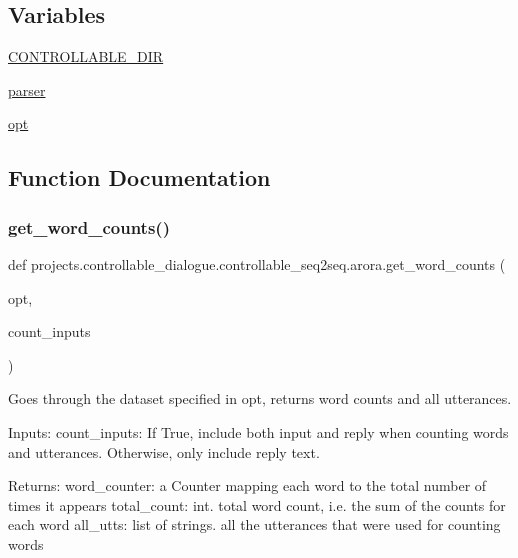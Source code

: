 \subsection*{Variables}
\begin{DoxyCompactItemize}
\item 
\hyperlink{namespaceprojects_1_1controllable__dialogue_1_1controllable__seq2seq_1_1arora_a13b07efaa3e2bffc511e07c6b5bd5522}{C\+O\+N\+T\+R\+O\+L\+L\+A\+B\+L\+E\+\_\+\+D\+IR}
\item 
\hyperlink{namespaceprojects_1_1controllable__dialogue_1_1controllable__seq2seq_1_1arora_a59a3a3e672547353559a3eda4ba96870}{parser}
\item 
\hyperlink{namespaceprojects_1_1controllable__dialogue_1_1controllable__seq2seq_1_1arora_a2cdfcf7449581870a10f134649dd8d7f}{opt}
\end{DoxyCompactItemize}


\subsection{Function Documentation}
\mbox{\label{namespaceprojects_1_1controllable__dialogue_1_1controllable__seq2seq_1_1arora_a2a5256a5d5666134bc2a89b0fe831fcd}} 
\subsubsection{\texorpdfstring{get\+\_\+word\+\_\+counts()}{get\_word\_counts()}}
{\footnotesize\ttfamily def projects.\+controllable\+\_\+dialogue.\+controllable\+\_\+seq2seq.\+arora.\+get\+\_\+word\+\_\+counts (\begin{DoxyParamCaption}\item[{}]{opt,  }\item[{}]{count\+\_\+inputs }\end{DoxyParamCaption})}

\begin{DoxyVerb}Goes through the dataset specified in opt, returns word counts and all utterances.

Inputs:
  count_inputs: If True, include both input and reply when counting words and
    utterances. Otherwise, only include reply text.

Returns:
  word_counter: a Counter mapping each word to the total number of times it appears
  total_count: int. total word count, i.e. the sum of the counts for each word
  all_utts: list of strings. all the utterances that were used for counting words
\end{DoxyVerb}
 

